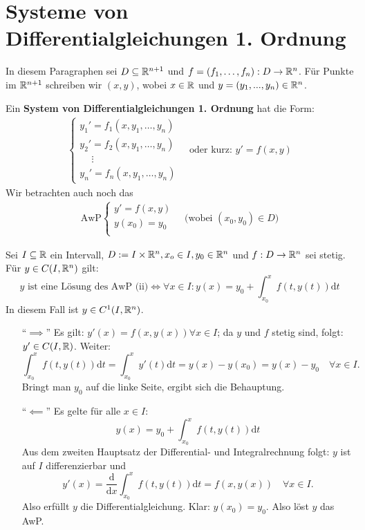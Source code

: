 \documentclass[a4paper,oneside,DIV15,BCOR12mm,chapterprefix=true,headings=onelinechapter]{scrbook}
\begin{document}
\chapter{Systeme von Differentialgleichungen 1. Ordnung}

In diesem Paragraphen sei $D \subseteq \mathbb{R}^{n+1}$ und $f = (f_1, \ldots, f_n): D \to \mathbb{R}^n$. Für Punkte im $\mathbb{R}^{n+1}$ schreiben wir $(x,y)$, wobei $x \in \mathbb{R}$ und $y = (y_1,...,y_n) \in \mathbb{R}^n$.

\begin{definition}
Ein \textbf{System von Differentialgleichungen 1. Ordnung} hat die Form:
\begin{align*}
\begin{cases}
y_1'=f_1(x, y_1, \ldots, y_n)\\
y_2'=f_2(x, y_1, \ldots, y_n)\\
\quad\ \vdots\\
y_n'=f_n(x, y_1, \ldots, y_n)
\end{cases}
\tag{i}
\quad\text{oder kurz: } y'=f(x,y)
\end{align*}
Wir betrachten auch noch das
\begin{align*}
\text{AwP}
\begin{cases}
y'=f(x,y)\\
y(x_0) = y_0\\
\end{cases}
\tag{ii}
\quad\text{(wobei } (x_0, y_0) \in D)
\end{align*}
\end{definition}

\begin{satz}
Sei $I \subseteq \mathbb{R}$ ein Intervall, $D := I \times \mathbb{R}^n, x_o\in I, y_0\in \mathbb{R}^n$ und $f:D\to\mathbb{R}^n$ sei stetig. Für $y\in C(I,\mathbb{R}^n)$ gilt:
\[\text{$y$ ist eine Lösung des AwP (ii)} \iff  \forall x\in I:y(x) = y_0 + \int_{x_0}^x f(t, y(t)) \text{d}t \]
In diesem Fall ist $y \in C^1(I, \mathbb{R}^n)$.
\end{satz}

\begin{beweis}
\begin{enumerate}
\item["`$\implies$"'] Es gilt: $y'(x) = f(x, y(x)) \forall x\in I$; da $y$ und $f$ stetig sind, folgt: $y' \in C(I,\mathbb{R} )$. Weiter:
\[\int_{x_0}^x f(t,y(t)) \text{d}t = \int_{x_0}^x y'(t)\text{d}t = y(x) - y(x_0) = y(x) - y_0 \quad \forall x\in I.\]
Bringt man $y_0$ auf die linke Seite, ergibt sich die Behauptung.
\item["`$\impliedby$"'] Es gelte für alle $x\in I$:
\[y(x) = y_0  + \int_{x_0}^x f(t, y(t))\text{d}t\]
Aus dem zweiten Hauptsatz der Differential- und Integralrechnung folgt: $y$ ist auf $I$ differenzierbar und 
\[ y'(x) = \frac{\text{d}}{\text{d}x} \int_{x_0}^x f(t, y(t))\text{d}t = f(x, y(x)) \quad \forall x \in I. \]
Also erfüllt $y$ die Differentialgleichung.
Klar: $y(x_0) = y_0$. Also löst $y$ das AwP.
\end{enumerate}
\end{beweis}
\end{document}
